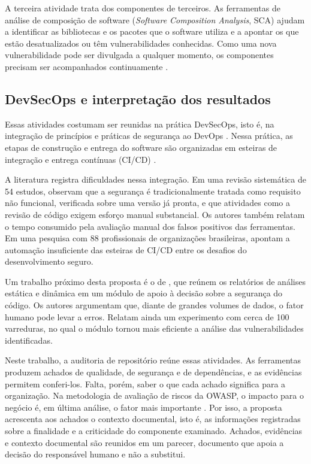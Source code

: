 A terceira atividade trata dos componentes de terceiros. As ferramentas de análise de composição de software (\textit{Software Composition Analysis}, SCA) ajudam a identificar as bibliotecas e os pacotes que o software utiliza e a apontar os que estão desatualizados ou têm vulnerabilidades conhecidas. Como uma nova vulnerabilidade pode ser divulgada a qualquer momento, os componentes precisam ser acompanhados continuamente \cite{blackIr8397}.

\subsection{DevSecOps e interpretação dos resultados}
\label{rt-2-1-3}

Essas atividades costumam ser reunidas na prática DevSecOps, isto é, na integração de princípios e práticas de segurança ao DevOps \cite{rajapakse2022}. Nessa prática, as etapas de construção e entrega do software são organizadas em esteiras de integração e entrega contínuas (CI/CD) \cite{chandramouli2024}.

A literatura registra dificuldades nessa integração. Em uma revisão sistemática de 54 estudos,  observam que a segurança é tradicionalmente tratada como requisito não funcional, verificada sobre uma versão já pronta, e que atividades como a revisão de código exigem esforço manual substancial. Os autores também relatam o tempo consumido pela avaliação manual dos falsos positivos das ferramentas. Em uma pesquisa com 88 profissionais de organizações brasileiras,  apontam a automação insuficiente das esteiras de CI/CD entre os desafios do desenvolvimento seguro.

Um trabalho próximo desta proposta é o de , que reúnem os relatórios de análises estática e dinâmica em um módulo de apoio à decisão sobre a segurança do código. Os autores argumentam que, diante de grandes volumes de dados, o fator humano pode levar a erros. Relatam ainda um experimento com cerca de 100 varreduras, no qual o módulo tornou mais eficiente a análise das vulnerabilidades identificadas.

Neste trabalho, a auditoria de repositório reúne essas atividades. As ferramentas produzem achados de qualidade, de segurança e de dependências, e as evidências permitem conferi-los. Falta, porém, saber o que cada achado significa para a organização. Na metodologia de avaliação de riscos da OWASP, o impacto para o negócio é, em última análise, o fator mais importante \cite{owaspRiskRating}. Por isso, a proposta acrescenta aos achados o contexto documental, isto é, as informações registradas sobre a finalidade e a criticidade do componente examinado. Achados, evidências e contexto documental são reunidos em um parecer, documento que apoia a decisão do responsável humano e não a substitui.

